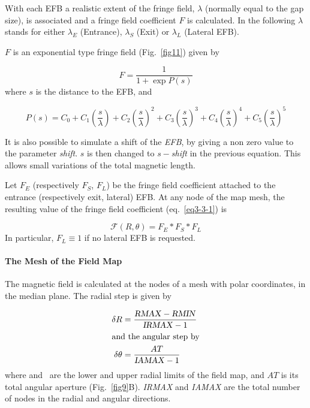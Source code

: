 {\noindent With  each EFB a realistic extent of the fringe field, $\lambda $ 
(normally equal to the gap size), is associated and a fringe field coefficient
$ F $ is calculated. In the following $\lambda$ stands for either $ \lambda_ E $
(Entrance), $ \lambda_ S $ (Exit) or $ \lambda_ L $ (Lateral EFB).  
\bigskip

\noindent$ F $ is an exponential type fringe field (Fig.~\ref{fig11}) 
given by~\cite{Biblio12}     %

$$ F = \dfrac{1 }{ 1+ \exp P(s)} $$
%
 where $ s $ is the distance to the EFB, and 

$$
    P(s) = C_0
       +C_1 \left(  \dfrac{s }{ \lambda} \right) 
       +C_2 \left( \dfrac{s }{ \lambda} \right)^2 
       + C_3 \left( \dfrac{s }{ \lambda} \right)^3 
       +C_4 \left( \dfrac{s }{ \lambda} \right)^4 
       + C_5 \left(\dfrac{s }{ \lambda} \right)^5 $$
       
\noindent It is also possible to simulate a shift of the \textsl{EFB}, by giving a non
zero value to the parameter \textsl{shift}.  $ s $ is then changed to $ s -$\textsl{shift} in the 
previous equation.   This allows small variations of the total magnetic length.  
\bigskip

\noindent Let $ F_E $ (respectively $ F_S$, $F_L$)  be the fringe field
coefficient attached to the entrance (respectively exit, lateral) EFB. At any node of the map 
mesh, the resulting value of the fringe field coefficient (eq.~\ref{eq3-3-1}) is

$$  \mathcal{F}(R,\theta) = F_E  \ast  F_S \ast   F_L $$
%
In particular, $F_L\equiv 1 $  if no lateral EFB is requested. 

\paragraph{The Mesh of the Field Map} 

\noindent The magnetic field is calculated at the nodes of a mesh with polar
coordinates, in the median plane.  The radial step is given by 

 \begin{align*}
	 \delta R & = \dfrac{\text{\textsl{RMAX}} - \text{\textsl{RMIN}} }{\text{\textsl{IRMAX}}-1} \\
	\intertext{and the angular step by} 
	 \delta \theta  & = \dfrac{AT }{\text{\textsl{IAMAX}}-1} 
 \end{align*}
\noindent where \RMIN  and \RMAX\   are the lower and upper
radial limits of the field map, and $ AT $ is its total angular aperture (Fig.~\ref{fig9}B).  
 \textsl{IRMAX}  and \textsl{IAMAX} are 
the total number of nodes in the radial and angular directions. 

}
